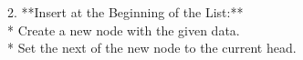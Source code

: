 \documentclass[preview]{standalone}
\begin{document}
2.  **Insert at the Beginning of the List:**\\*   Create a new node with the given data.\\*   Set the next of the new node to the current head.\\
\end{document}
